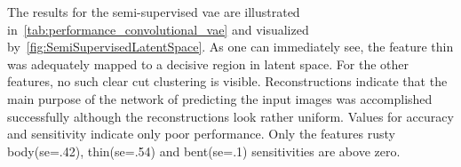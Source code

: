\begin{table}[!htb]
	\centering
	\caption[Semi-Supervised Convolutional Autoencoder Performance]{\textbf{Convolutional Autoencoder Performance}~~~Performance of the Semi-Supervised Convolutional Autoencoder.}
	\label{tab:performance_semi_supervised_autoencoder}
\end{table}

\bigskip
The results for the semi-supervised \acrlong{vae} are illustrated in~\autoref{tab:performance_convolutional_vae} and visualized by~\autoref{fig:SemiSupervisedLatentSpace}. As one can immediately see, the feature thin was adequately mapped to a decisive region in latent space. For the other features, no such clear cut clustering is visible. Reconstructions indicate that the main purpose of the network of predicting the input images was accomplished successfully although the reconstructions look rather uniform. Values for accuracy and sensitivity indicate only poor performance. Only the features rusty body(se=.42), thin(se=.54) and bent(se=.1) sensitivities are above zero.


